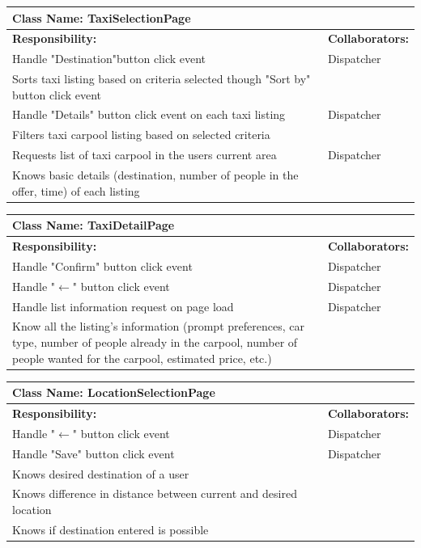 \documentclass[]{article}
\begin{document}
	\begin{table}[H]
	\centering
	\begin{tabular}{|p{6cm}|p{6cm}|}
	\hline 
		\multicolumn{2}{|l|}{\textbf{Class Name: TaxiSelectionPage}} \\
	\hline
	\textbf{Responsibility:} & \textbf{Collaborators:} \\
	\hline
	Handle "Destination"button click event& Dispatcher \\ \hline
	Sorts taxi listing based on criteria selected though "Sort by" button click event  & \\ \hline
	Handle "Details" button click event  on each taxi listing & Dispatcher \\ \hline
	Filters taxi carpool listing based on selected criteria & \\ \hline
	Requests list of taxi carpool in the users current area & Dispatcher \\ \hline
	Knows basic details (destination, number of people in the offer, time) of each listing & \\ \hline
	\end{tabular}
	\end{table}
	

	\begin{table}[H]
	\centering
	\begin{tabular}{|p{6cm}|p{6cm}|}
	\hline 
		\multicolumn{2}{|l|}{\textbf{Class Name: TaxiDetailPage}} \\
	\hline
	\textbf{Responsibility:} & \textbf{Collaborators:} \\
	\hline
	Handle "Confirm" button click event  & Dispatcher \\ \hline
	Handle "$\xleftarrow{}$" button click event  & Dispatcher \\ \hline
	Handle list information request on page load & Dispatcher\\ \hline
	Know all the listing's information (prompt preferences, car type, number of people already in the carpool, number of people wanted for the carpool, estimated price, etc.)  & \\ \hline
	\end{tabular}
	\end{table}
	
	\begin{table}[H]
	\centering
	\begin{tabular}{|p{6cm}|p{6cm}|}
	\hline 
		\multicolumn{2}{|l|}{\textbf{Class Name: LocationSelectionPage}} \\
	\hline
	\textbf{Responsibility:} & \textbf{Collaborators:} \\
	\hline
	Handle "$\xleftarrow{}$" button click event  & Dispatcher \\ \hline
	Handle "Save" button click event  & Dispatcher\\ \hline
	Knows desired destination of a user & \\ \hline
	Knows difference in distance between current and desired location & \\ \hline
	Knows if destination entered is possible & \\ \hline
	\end{tabular}
	\end{table}
	
\end{document}
